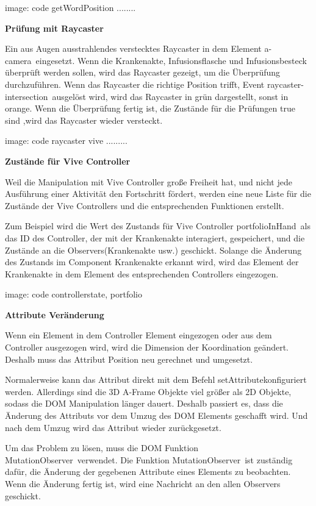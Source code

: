   image: code getWordPosition ........
  
  \textbf{Prüfung mit Raycaster}
  
  Ein aus Augen ausstrahlendes verstecktes Raycaster in dem Element \glqq a-camera\grqq\ eingesetzt. Wenn die Krankenakte, Infusionsflasche und Infusionsbesteck überprüft werden sollen, wird das Raycaster gezeigt, um die Überprüfung durchzuführen. Wenn das Raycaster die richtige Position trifft, Event \glqq raycaster-intersection\grqq\ ausgelöst wird, wird das Raycaster in grün dargestellt, sonst in orange. Wenn die Überprüfung fertig ist, die Zustände für die Prüfungen true sind ,wird das Raycaster wieder versteckt.
  
  image: code raycaster vive .........
  
  \textbf{Zustände für Vive Controller}
  
  Weil die Manipulation mit Vive Controller große Freiheit hat, und nicht jede Ausführung einer Aktivität den Fortschritt fördert, werden eine neue Liste für die Zustände der Vive Controllers und die entsprechenden Funktionen erstellt.
  
  Zum Beispiel wird die Wert des Zustands für Vive Controller \glqq portfolioInHand\grqq\ als das ID des Controller, der mit der Krankenakte interagiert, gespeichert, und die Zustände an die Observers(Krankenakte usw.) geschickt. Solange die Änderung des Zustands im Component Krankenakte erkannt wird, wird das Element der Krankenakte in dem Element des entsprechenden Controllers eingezogen.
  
  image: code controllerstate, portfolio
  
  \textbf{Attribute Veränderung}
  
  Wenn ein Element in dem Controller Element eingezogen oder aus dem Controller ausgezogen wird, wird die Dimension der Koordination geändert. Deshalb muss das Attribut Position neu gerechnet und umgesetzt.
  
  Normalerweise kann das Attribut direkt mit dem Befehl \glqq setAttribute\grqq konfiguriert werden. Allerdings sind die 3D A-Frame Objekte viel größer als 2D Objekte, sodass die DOM Manipulation länger dauert. Deshalb passiert es, dass die Änderung des Attributs vor dem Umzug des DOM Elements geschafft wird. Und nach dem Umzug wird das Attribut wieder zurückgesetzt.
  
  Um das Problem zu lösen, muss die DOM Funktion \glqq MutationObserver\grqq\ verwendet. Die Funktion \glqq MutationObserver\grqq\ ist zuständig dafür, die Änderung der gegebenen Attribute eines Elements zu beobachten. Wenn die Änderung fertig ist, wird eine Nachricht an den allen Observers geschickt.
  
